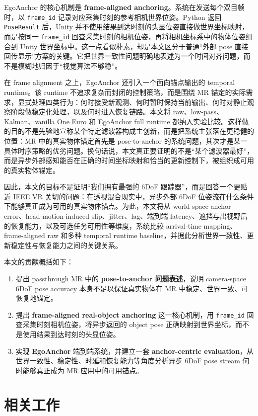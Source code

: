 \documentclass[review]{vgtc}
\begin{document}
EgoAnchor 的核心机制是 \textbf{frame-aligned anchoring}。系统在发送每个双目帧时，以 \texttt{frame\_id} 记录对应采集时刻的参考相机世界位姿。Python 返回 \texttt{PoseResult} 后，Unity 并不使用结果到达时刻的头显位姿直接做世界坐标映射，而是按同一 \texttt{frame\_id} 回查采集时刻的相机位姿，再将相机坐标系中的物体位姿组合到 Unity 世界坐标中。这一点看似朴素，却是本文区分于普通“外部 pose 直接回传显示”方案的关键。它把世界一致性问题明确地表述为一个时间对齐问题，而不是模糊地归因于“视觉算法不够稳”。

在 frame alignment 之上，EgoAnchor 还引入一个面向锚点输出的 temporal runtime。该 runtime 不追求复杂而封闭的控制策略，而是围绕 MR 锚定的实际需求，显式处理四类行为：何时接受新观测、何时暂时保持当前输出、何时对静止观察阶段做稳定化处理，以及何时进入恢复链路。本文将 raw、low-pass、Kalman、vanilla One Euro 和 EgoAnchor full runtime 都纳入实验比较。这样做的目的不是先验地宣称某个特定滤波器构成主创新，而是把系统主张落在更稳健的位置：MR 中的真实物体锚定首先是 pose-to-anchor 的系统问题，其次才是某一具体时序策略的优劣问题。换句话说，本文真正要证明的不是“某个滤波器最好”，而是异步外部感知能否在正确的时间坐标映射和恰当的更新控制下，被组织成可用的真实物体锚定。

因此，本文的目标不是证明“我们拥有最强的 6DoF 跟踪器”，而是回答一个更贴近 IEEE VR 关切的问题：在透视混合现实中，异步外部 6DoF 位姿流在什么条件下能够真正成为可用的真实物体锚点。为此，本文将从 world-space anchor error、head-motion-induced slip、jitter、lag、端到端 latency、遮挡与出视野后的恢复能力，以及可选任务可用性等维度，系统比较 arrival-time mapping、frame-aligned raw 和多种 temporal runtime baseline，并据此分析世界一致性、更新稳定性与恢复能力之间的关键关系。

本文的贡献概括如下：
\begin{enumerate}
  \item 提出 passthrough MR 中的 \textbf{pose-to-anchor 问题表述}，说明 camera-space 6DoF pose accuracy 本身不足以保证真实物体在 MR 中稳定、世界一致、可恢复地锚定。
  \item 提出 \textbf{frame-aligned real-object anchoring} 这一核心机制，用 \texttt{frame\_id} 回查采集时刻相机位姿，将异步返回的 object pose 正确映射到世界坐标，而不是使用结果到达时刻的头显位姿。
  \item 实现 \textbf{EgoAnchor} 端到端系统，并建立一套 \textbf{anchor-centric evaluation}，从世界一致性、稳定性、时延和恢复能力等角度分析异步 6DoF pose stream 何时能够真正成为 MR 应用中的可用锚点。
\end{enumerate}

\section{相关工作}
\end{document}
